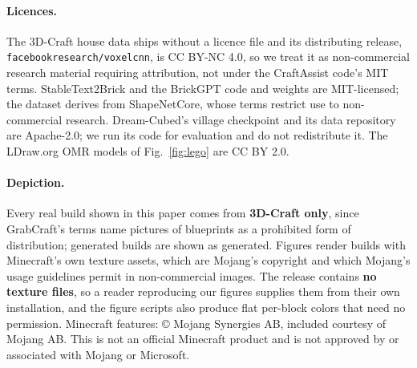 \paragraph{Licences.} The 3D-Craft house data ships without a licence file and
its distributing release, \texttt{facebookresearch/voxelcnn}, is CC BY-NC 4.0, so
we treat it as non-commercial research material requiring attribution, not under
the CraftAssist code's MIT terms. StableText2Brick and the BrickGPT code and
weights are MIT-licensed; the dataset derives from ShapeNetCore, whose terms
restrict use to non-commercial research. Dream-Cubed's village checkpoint and its
data repository are Apache-2.0; we run its code for evaluation and do not
redistribute it. The LDraw.org OMR models of Fig.~\ref{fig:lego} are CC BY 2.0.

\paragraph{Depiction.} Every real build shown in this paper comes from
\textbf{3D-Craft only}, since GrabCraft's terms name pictures of blueprints as a
prohibited form of distribution; generated builds are shown as generated. Figures
render builds with Minecraft's own texture assets, which are Mojang's copyright and
which Mojang's usage guidelines permit in non-commercial images. The release
contains \textbf{no texture files}, so a reader reproducing our figures supplies
them from their own installation, and the figure scripts also produce flat
per-block colors that need no permission. Minecraft features: \copyright{} Mojang
Synergies AB, included courtesy of Mojang AB. This is not an official Minecraft
product and is not approved by or associated with Mojang or Microsoft.
